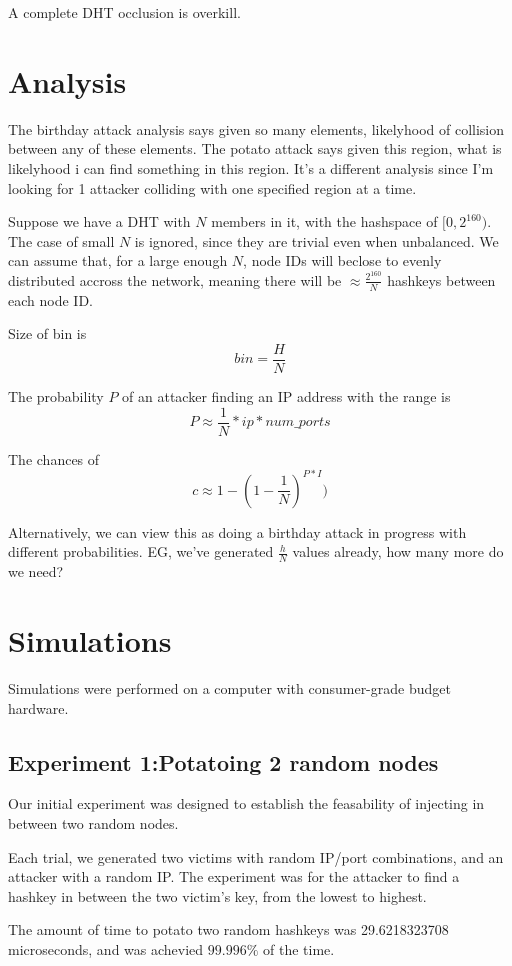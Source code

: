 \documentclass[10pt,a4paper]{article}
\begin{document}
A complete DHT occlusion is overkill.
\section{Analysis}

\cite{bellare2004hash}

The birthday attack analysis says given so many elements, likelyhood of collision between any of these elements.
The potato attack says given this region, what is likelyhood i can find something in this region.  
It's a different analysis since I'm looking for 1 attacker colliding with one specified region at a time.

Suppose we have a DHT with $N$ members in it, with the hashspace of $[0,2^{160})$.
The case of small $N$ is ignored, since they are trivial even when unbalanced.
We can assume that, for a large enough $N$, node IDs will beclose to evenly distributed accross the network, meaning there will be $\approx \frac{2^{160}}{N}$ hashkeys between each node ID.


Size of bin is $$ bin =  \frac{H}{N} $$

The probability $P$ of an attacker finding an IP address with the range is 
$$ P \approx \frac{1}{N}*ip*num\_ports  $$


The chances of 
$$c \approx  1 - (1 -\frac{1}{N})^{P*I})  $$

Alternatively, we can view this as doing a birthday attack in progress with different probabilities.
EG, we've generated $\frac{h}{N}$ values already, how many more do we need?


\section{Simulations}
Simulations were performed on a computer with consumer-grade budget hardware. 


\subsection{Experiment 1:Potatoing 2 random nodes}
Our initial experiment was designed to establish the feasability of injecting in between two random nodes.

Each trial, we generated two victims with random IP/port combinations, and an attacker with a random IP.
The experiment was for the attacker to find a hashkey in between the two victim's key, from the lowest to highest.

The amount of time to potato two random hashkeys was 29.6218323708 microseconds, and was achevied $ 99.996\%$ of the time.
\end{document}
